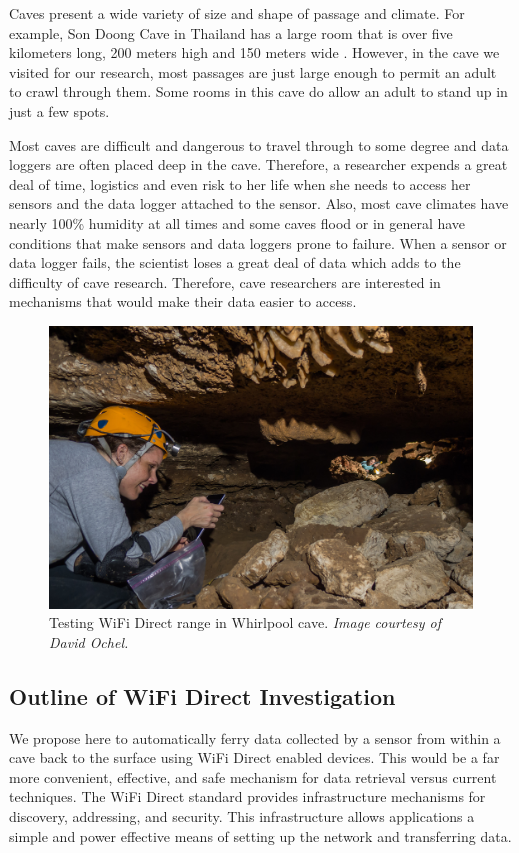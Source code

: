 \documentclass[10pt,twocolumn]{article}
\begin{document}
Caves present a wide variety of size and shape of passage and climate. 
For example, Son Doong Cave in Thailand has a large room that is over five kilometers long, 200 meters high and 150 meters wide \cite{sondoong}.
However, in the cave we visited for our research, most passages are just large enough to permit an adult to crawl through them.
Some rooms in this cave do allow an adult to stand up in just a few spots.

Most caves are difficult and dangerous to travel through to some degree and data loggers are often placed deep in the cave.
Therefore, a researcher expends a great deal of time, logistics and even risk to her life when she needs to access her sensors and the data logger attached to the sensor.
Also, most cave climates have nearly 100\% humidity at all times and some caves flood or in general have conditions that make sensors and data loggers prone to failure.
When a sensor or data logger fails, the scientist loses a great deal of data which adds to the difficulty of cave research.
Therefore, cave researchers are interested in mechanisms that would make their data easier to access.

\begin{figure}[t]
\includegraphics[width=\textwidth]{cavewifi2}
\caption{Testing WiFi Direct range in Whirlpool cave. \textit{Image courtesy of David Ochel.}}
\end{figure}

\subsection{Outline of WiFi Direct Investigation}
\label{sec:Outline}
We propose here to automatically ferry data collected by a sensor from within a cave back to the surface using WiFi Direct enabled devices. 
This would be a far more convenient, effective, and safe mechanism for data retrieval versus current techniques.  
The WiFi Direct standard provides infrastructure mechanisms for discovery, addressing, and security. 
This infrastructure allows applications a simple and power effective means of setting up the network and transferring data. 
\end{document}
